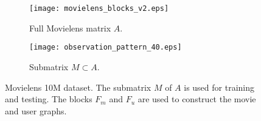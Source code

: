 \documentclass{article}
\begin{document}
\begin{figure}
        \begin{subfigure}[b]{.5\linewidth}
\centering \texttt{[image: movielens\_blocks\_v2.eps]}
	\vspace{-0.25cm}
            \vspace{0.65cm}
            \caption{Full Movielens matrix $A$.}\label{fig:movielens_blocks}
	\vspace{-0.15cm}
          \end{subfigure}
          \begin{subfigure}[b]{.5\linewidth}
            \centering\texttt{[image: observation\_pattern\_40.eps]}
	\vspace{-0.2cm}
            \caption{Submatrix $M\subset A$.}\label{fig:part_movielens}
	\vspace{-0.15cm}
          \end{subfigure}
          \caption{Movielens 10M dataset. The submatrix $M$ of $A$ is used for training and testing. The blocks $F_m$ and $F_u$ are used to construct the movie and user graphs.}\label{fig:movielens}
	\vspace{-0.25cm}
\end{figure}
\end{document}
